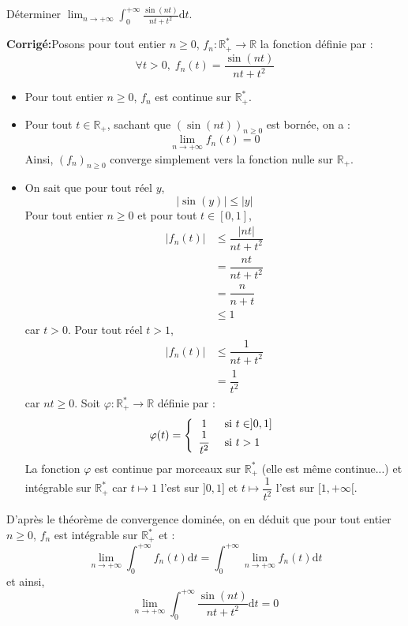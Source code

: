 \documentclass[a4paper,twoside,french,10pt]{VcCours}
\newcommand{\dt}{\text{d}t}
\newcommand{\corr}{\textbf{Corrigé:}}
\begin{document}
\medskip

\begin{Exercice}{} Déterminer $\lim_{n \to + \infty} \int_{0}^{ + \infty} \frac{\sin(nt)}{nt + t^{2}} \dt$.
\end{Exercice}

\corr Posons pour tout entier $n \geq 0$, $f_n : \mathbb{R}_+^* \rightarrow \mathbb{R}$ la fonction définie par :
$$ \forall t >0, \; f_n(t) = \frac{\sin(nt)}{nt + t^{2}}$$
\begin{itemize}
\item Pour tout entier $n \geq 0$, $f_n$ est continue sur $\mathbb{R}_+^*$.
\item Pour tout $t \in \mathbb{R}_+$, sachant que $(\sin(nt))_{n \geq 0}$ est bornée, on a :
$$ \lim_{n \rightarrow + \infty} f_n(t) = 0$$
Ainsi, $(f_n)_{n \geq 0}$ converge simplement vers la fonction nulle sur $\mathbb{R}_+$.
\item On sait que pour tout réel $y$,
$$ \vert \sin(y) \vert \leq \vert y \vert$$
Pour tout entier $n \geq 0$ et pour tout $t \in [0,1]$,
\begin{align*}
\vert f_n(t) \vert & \leq \dfrac{\vert nt \vert }{nt+t^2} \\
& = \dfrac{nt}{nt+t^2} \\
& = \dfrac{n}{n+t} \\
& \leq 1
\end{align*}
car $t >0$. Pour tout réel $t>1$,
\begin{align*}
\vert f_n(t) \vert & \leq \dfrac{1}{nt+t^2} \\
& = \dfrac{1}{t^2} 
\end{align*}
car $nt \geq 0$. Soit $\varphi : \mathbb{R}_+^* \rightarrow \mathbb{R}$ définie par :
$$ \varphi(t) = \left\lbrace \begin{array}{cl}
1 & \hbox{ si } t \in ]0,1] \\
\dfrac{1}{t^2} & \hbox{ si } t>1 \\
\end{array}\right.$$
La fonction $\varphi$ est continue par morceaux sur $\mathbb{R}_+^*$ (elle est même continue...) et intégrable sur $\mathbb{R}_+^*$ car $t \mapsto 1$ l'est sur $]0,1]$ et $t \mapsto \dfrac{1}{t^2}$ l'est sur $[1, + \infty[$. 
\end{itemize}
D'après le théorème de convergence dominée, on en déduit que pour tout entier $n \geq 0$, $f_n$ est intégrable sur $\mathbb{R}_+^*$ et :
$$ \lim_{n \rightarrow + \infty} \int_0^{+ \infty} f_n(t) \dt = \int_0^{+ \infty} \lim_{n \rightarrow + \infty}f_n(t) \dt$$
et ainsi,
$$ \lim_{n \to + \infty} \int_{0}^{ + \infty} \frac{\sin(nt)}{nt + t^{2}} \dt = 0$$
\end{document}
